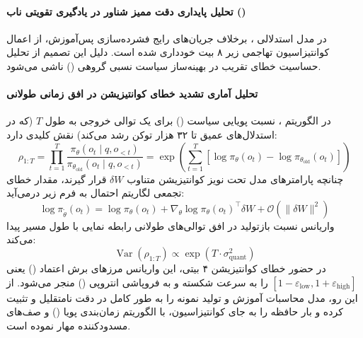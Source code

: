 \item {}

\paragraph*{تحلیل پایداری دقت ممیز شناور در یادگیری تقویتی ناب ()}
در مدل استدلالی  \cite{mistral2025magistral}، برخلاف جریان‌های رایج فشرده‌سازی پس‌آموزش، از اعمال کوانتیزاسیون تهاجمی زیر ۸ بیت خودداری شده است. دلیل این تصمیم از تحلیل حساسیت خطای تقریب در بهینه‌ساز سیاست نسبی گروهی () ناشی می‌شود.

\paragraph*{تحلیل آماری تشدید خطای کوانتیزیشن در افق زمانی طولانی}
در الگوریتم ، نسبت پویایی سیاست () برای یک توالی خروجی به طول $T$ (که در استدلال‌های عمیق تا ۳۲ هزار توکن رشد می‌کند) نقش کلیدی دارد:
\begin{equation}
    \rho_{1:T} = \prod_{t=1}^{T} \frac{\pi_\theta(o_t \mid q, o_{<t})}{\pi_{\theta_{\text{old}}}(o_t \mid q, o_{<t})} = \exp\left( \sum_{t=1}^{T} \left[ \log \pi_\theta(o_t) - \log \pi_{\theta_{\text{old}}}(o_t) \right] \right)
\end{equation}
چنانچه پارامترهای مدل تحت نویز کوانتیزیشن متناوب $\delta W$ قرار گیرند، مقدار خطای تجمعی لگاریتم احتمال به فرم زیر درمی‌آید:
\begin{equation}
    \log \pi_{\tilde{\theta}}(o_t) = \log \pi_\theta(o_t) + \nabla_\theta \log \pi_\theta(o_t)^\top \delta W + \mathcal{O}(\|\delta W\|^2)
\end{equation}
واریانس نسبت بازتولید در افق توالی‌های طولانی رابطه نمایی با طول مسیر پیدا می‌کند:
\begin{equation}
    \operatorname{Var}(\rho_{1:T}) \propto \exp(T \cdot \sigma^2_{\text{quant}})
\end{equation}
در حضور خطای کوانتیزیشن ۴ بیتی، این واریانس مرزهای برش اعتماد () یعنی $[1-\varepsilon_{\text{low}}, 1+\varepsilon_{\text{high}}]$ را به سرعت شکسته و به فروپاشی انتروپی () منجر می‌شود. از این رو، مدل  محاسبات آموزش و تولید نمونه را به طور کامل در دقت نامتقلیل  و  تثبیت کرده و بار حافظه را به جای کوانتیزاسیون، با الگوریتم زمان‌بندی پویا () و صف‌های مسدودکننده مهار نموده است.

